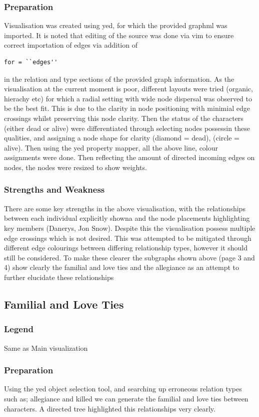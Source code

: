 \documentclass[twoside]{article}
\theoremstyle{definition}
\theoremstyle{definition}
\begin{document}
\subsubsection{Preparation}
Visualisation was created using yed, for which the provided graphml was imported. It is noted that editing of the source was done via vim to ensure correct importation of edges via addition of 
\begin{verbatim}
for = ``edges''
\end{verbatim}
in the relation and type sections of the provided graph information. As the visualisation at the current moment is poor, different layouts were tried (organic, hierachy etc) for which a radial setting with wide node dispersal was observed to be the best fit. This is due to the clarity in node positioning with minimial edge crossings whilst preserving this node clarity. Then the status of the characters (either dead or alive) were differentiated through selecting nodes possessin these qualities, and assigning a node shape for clarity (diamond = dead), (circle = alive). Then using the yed property mapper, all the above line, colour assignments were done. Then reflecting the amount of directed incoming edges on nodes, the nodes were resized to show weights.

\subsubsection{Strengths and Weakness}
There are some key strengths in the above visualisation, with the relationships between each individual explicitly showna and the node placements highlighting key members (Danerys, Jon Snow). Despite this the visualisation possess multiple edge crossings which is not desired. This was attempted to be mitigated through different edge colourings between differing relationship types, however it should still be considered. To make these clearer the subgraphs shown above (page 3 and 4) show clearly the familial and love ties and the allegiance as an attempt to further elucidate these relationships
\subsection{Familial and Love Ties}
\subsubsection{Legend} 
Same as Main visualization
\subsubsection{Preparation}
Using the yed object selection tool, and searching up erroneous relation types such as; allegiance and killed we can generate the familial and love ties between characters. A directed tree highlighted this relationships very clearly. 
\end{document}
